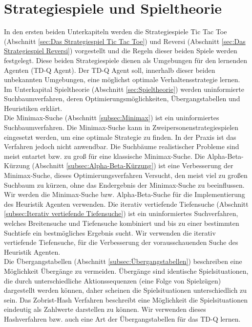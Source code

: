 
\chapter{Strategiespiele und Spieltheorie}
\label{cha:Strategiespiele und Spieltheorie}

In den ersten beiden Unterkapiteln werden die Strategiespiele Tic Tac Toe (Abschnitt \ref{sec:Das Strategiespiel Tic Tac Toe}) und Reversi (Abschnitt \ref{sec:Das Strategiespiel Reversi}) vorgestellt und die Regeln dieser beiden Spiele werden festgelegt. Diese beiden Strategiespiele dienen als Umgebungen für den lernenden Agenten (TD-Q Agent). Der TD-Q Agent soll, innerhalb dieser beiden unbekannten Umgebungen, eine möglichst optimale Verhaltensstrategie lernen. \\

Im Unterkapital Spieltheorie (Abschnitt \ref{sec:Spieltheorie}) werden uninformierte Suchbaumverfahren, deren Optimierungsmöglichkeiten, Übergangstabellen und Heuristiken erklärt.\\

Die Minimax-Suche (Abschnitt \ref{subsec:Minimax}) ist ein uninformiertes Suchbaumverfahren. Die Minimax-Suche kann in Zweipersonenstrategiespielen eingesetzt werden, um eine optimale Strategie zu finden. In der Praxis ist das Verfahren jedoch nicht anwendbar. Die Suchbäume realistischer Probleme sind meist entartet bzw. zu groß für eine klassische Minimax-Suche. Die Alpha-Beta-Kürzung (Abschnitt \ref{subsec:Alpha-Beta-Kürzung}) ist eine Verbesserung der Minimax-Suche, dieses Optimierungsverfahren Versucht, den meist viel zu großen Suchbaum zu kürzen, ohne das Endergebnis der Minimax-Suche zu beeinflussen. Wir werden die Minimax-Suche bzw. Alpha-Beta-Suche für die Implementierung des Heuristik Agenten verwenden. Die iterativ vertiefende Tiefensuche (Abschnitt \ref{subsec:Iterativ vertiefende Tiefensuche}) ist ein uninformiertes Suchverfahren, welches Breitensuche und Tiefensuche kombiniert und bis zu einer bestimmten Suchtiefe ein bestmögliches Ergebnis sucht. Wir verwenden die iterativ vertiefende Tiefensuche, für die Verbesserung der vorausschauenden Suche des Heuristik Agenten. \\

Die Übergangstabellen (Abschnitt \ref{subsec:Übergangstabellen}) beschreiben eine Möglichkeit Übergänge zu vermeiden. Übergänge sind identische Spielsituationen, die durch unterschiedliche Aktionssequenzen (eine Folge von Spielzügen) dargestellt werden können, daher scheinen die Spielsituationen unterschiedlich zu sein. Das Zobrist-Hash Verfahren beschreibt eine Möglichkeit die Spielsituationen eindeutig als Zahlwerte darstellen zu können. Wir verwenden dieses Hashverfahren bzw. auch eine Art der Übergangstabellen für das TD-Q lernen. \\

